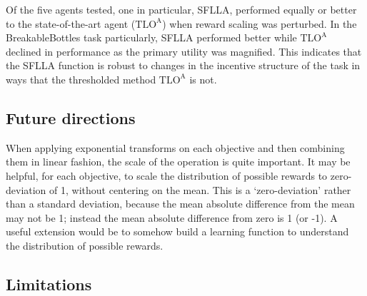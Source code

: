 


Of the five agents tested, one in particular, SFLLA, performed equally or better to the state-of-the-art agent ($\text{TLO}^\text{A}$) when reward scaling was perturbed. In the BreakableBottles task particularly, SFLLA performed better while $\text{TLO}^\text{A}$ declined in performance as the primary utility was magnified. This indicates that the SFLLA function is robust to changes in the incentive structure of the task in ways that the thresholded method $\text{TLO}^\text{A}$ is not.



\subsection{Future directions}

When applying exponential transforms on each objective and then combining them in linear fashion, the scale of the operation is quite important. It may be helpful, for each objective, to scale the distribution of possible rewards to zero-deviation of 1, without centering on the mean. This is a `zero-deviation' rather than a standard deviation, because the mean absolute difference from the mean may not be 1; instead the mean absolute difference from zero is 1 (or -1). A useful extension would be to somehow build a learning function to understand the distribution of possible rewards.

\subsection{Limitations}

